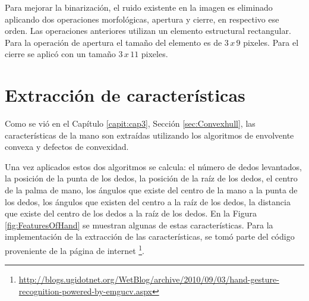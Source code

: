 Para mejorar la binarizaci\'on, el ruido existente en la imagen es eliminado aplicando dos operaciones morfológicas, apertura y cierre, en respectivo ese orden. Las operaciones anteriores utilizan un elemento estructural rectangular. Para la operación de apertura el tamaño del elemento es de $3 \, x \, 9$ pixeles. Para el cierre se aplic\'o con un tamaño  $3\, x \, 11$ pixeles.



\section{Extracción de características}\label{sec:ExtraccionCaracteristicasSystem}

Como se vi\'o en el Capítulo \ref{capit:cap3}, Sección \ref{sec:Convexhull}, las características de la mano son extraídas utilizando los algoritmos de envolvente convexa y  defectos de convexidad.


Una vez aplicados estos dos algoritmos se calcula: el número de dedos levantados, la posición de la punta de los dedos, la posición de la raíz de los dedos, el centro de la palma de mano, los ángulos que existe del centro de la mano a la punta de los dedos, los ángulos que existen del centro a la raíz de los dedos, la distancia que existe del centro de los dedos a la raíz de los dedos. En la Figura \ref{fig:FeaturesOfHand} se muestran algunas de estas características. Para la implementación de la extracción de las características, se tom\'o parte del código proveniente de la p\'agina de internet \footnote{\url{http://blogs.ugidotnet.org/WetBlog/archive/2010/09/03/hand-gesture-recognition-powered-by-emgucv.aspx}}. 

